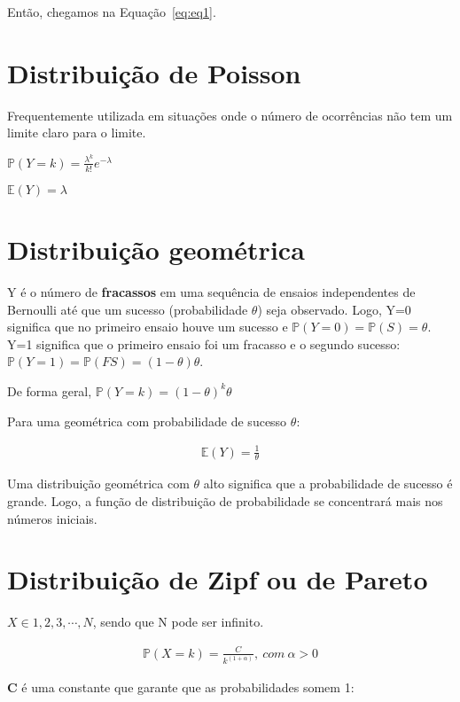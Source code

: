 \documentclass[11pt,a4paper]{article}
\begin{document}
		Então, chegamos na Equação~\ref{eq:eq1}.
		
		\section{Distribuição de Poisson}
		
		Frequentemente utilizada em situações onde o número de ocorrências não tem um limite claro para o limite.
		
		$\mathbb{P}(Y=k)=\frac{\lambda^k}{k!}e^{-\lambda}$
		
		$\mathbb{E}(Y)=\lambda$
		
		\section{Distribuição geométrica}
		
		Y é o número de \textbf{fracassos} em uma sequência de ensaios independentes de Bernoulli até que um sucesso (probabilidade $\theta$) seja observado.
		Logo, Y=0 significa que no primeiro ensaio houve um sucesso e $\mathbb{P}(Y=0)=\mathbb{P}(S)=\theta$.
		Y=1 significa que o primeiro ensaio foi um fracasso e o segundo sucesso: $\mathbb{P}(Y=1)=\mathbb{P}(FS)=(1-\theta)\theta$.
		
		De forma geral, $\mathbb{P}(Y=k)=(1-\theta)^k\theta$
		
		Para uma geométrica com probabilidade de sucesso $\theta$:
		
		\begin{eqnarray*}
			\mathbb{E}(Y)=\frac{1}{\theta}
		\end{eqnarray*}
		
		Uma distribuição geométrica com $\theta$ alto significa que a probabilidade de sucesso é grande.
		Logo, a função de distribuição de probabilidade se concentrará mais nos números iniciais.
		
		\section{Distribuição de Zipf ou de Pareto}
		
		$X\in {1,2,3,\cdots,N}$, sendo que N pode ser infinito.
		
		\begin{eqnarray*}
			\mathbb{P}(X=k)=\frac{C}{k^(1+\alpha)},~com~\alpha > 0
		\end{eqnarray*}
		
		\textbf{C} é uma constante que garante que as probabilidades somem 1:
		
\end{document}
